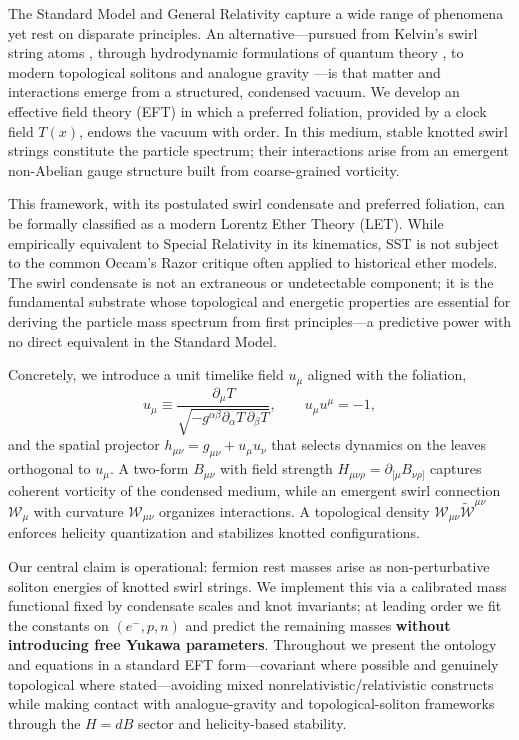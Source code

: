 \documentclass[smallextended]{svjour3}       %
\begin{document}
		The Standard Model and General Relativity capture a wide range of phenomena yet rest on disparate principles. An alternative—pursued from Kelvin’s swirl string atoms \cite{Kelvin1867}, through hydrodynamic formulations of quantum theory \cite{Madelung1927}, to modern topological solitons and analogue gravity \cite{Faddeev1997,Arnold1998,Barcelo2011,Volovik2003,Kleckner2013}—is that matter and interactions emerge from a structured, condensed vacuum. We develop an effective field theory (EFT) in which a preferred foliation, provided by a clock field \(T(x)\), endows the vacuum with order. In this medium, stable knotted swirl strings constitute the particle spectrum; their interactions arise from an emergent non-Abelian gauge structure built from coarse-grained vorticity.


		This framework, with its postulated swirl condensate and preferred foliation, can be formally classified as a modern Lorentz Ether Theory (LET). While empirically equivalent to Special Relativity in its kinematics, SST is not subject to the common Occam's Razor critique often applied to historical ether models. The swirl condensate is not an extraneous or undetectable component; it is the fundamental substrate whose topological and energetic properties are essential for deriving the particle mass spectrum from first principles—a predictive power with no direct equivalent in the Standard Model.

		Concretely, we introduce a unit timelike field \(u_\mu\) aligned with the foliation,
		\[
			u_\mu \equiv \frac{\partial_\mu T}{\sqrt{-g^{\alpha\beta}\partial_\alpha T\,\partial_\beta T}},
			\qquad u_\mu u^\mu = -1,
		\]
		and the spatial projector \(h_{\mu\nu}=g_{\mu\nu}+u_\mu u_\nu\) that selects dynamics on the leaves orthogonal to \(u_\mu\). A two-form \(B_{\mu\nu}\) with field strength \(H_{\mu\nu\rho}=\partial_{[\mu}B_{\nu\rho]}\) captures coherent vorticity of the condensed medium, while an emergent swirl connection \(\mathcal{W}_\mu\) with curvature \(\mathcal{W}_{\mu\nu}\) organizes interactions. A topological density \(\mathcal{W}_{\mu\nu}\tilde{\mathcal{W}}^{\mu\nu}\) enforces helicity quantization and stabilizes knotted configurations.

		Our central claim is operational: fermion rest masses arise as non-perturbative soliton energies of knotted swirl strings. We implement this via a calibrated mass functional fixed by condensate scales and knot invariants; at leading order we fit the constants on \((e^-,p,n)\) and predict the remaining masses \textbf{without introducing free Yukawa parameters}. Throughout we present the ontology and equations in a standard EFT form—covariant where possible and genuinely topological where stated—avoiding mixed nonrelativistic/relativistic constructs while making contact with analogue-gravity and topological-soliton frameworks through the \(H=dB\) sector and helicity-based stability.
\end{document}
